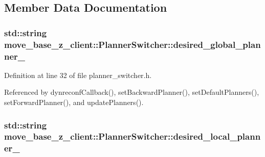 \subsection{Member Data Documentation}
\subsubsection[{\texorpdfstring{desired\+\_\+global\+\_\+planner\+\_\+}{desired_global_planner_}}]{\setlength{\rightskip}{0pt plus 5cm}std\+::string move\+\_\+base\+\_\+z\+\_\+client\+::\+Planner\+Switcher\+::desired\+\_\+global\+\_\+planner\+\_\+\hspace{0.3cm}{\ttfamily [private]}}\hypertarget{classmove__base__z__client_1_1PlannerSwitcher_a004c15858f0a6b9abcd8211d58a7e34c}{}\label{classmove__base__z__client_1_1PlannerSwitcher_a004c15858f0a6b9abcd8211d58a7e34c}


Definition at line 32 of file planner\+\_\+switcher.\+h.



Referenced by dynreconf\+Callback(), set\+Backward\+Planner(), set\+Default\+Planners(), set\+Forward\+Planner(), and update\+Planners().

\subsubsection[{\texorpdfstring{desired\+\_\+local\+\_\+planner\+\_\+}{desired_local_planner_}}]{\setlength{\rightskip}{0pt plus 5cm}std\+::string move\+\_\+base\+\_\+z\+\_\+client\+::\+Planner\+Switcher\+::desired\+\_\+local\+\_\+planner\+\_\+\hspace{0.3cm}{\ttfamily [private]}}\hypertarget{classmove__base__z__client_1_1PlannerSwitcher_ae47bd6c9c70b27cddcb394f26bb9372d}{}\label{classmove__base__z__client_1_1PlannerSwitcher_ae47bd6c9c70b27cddcb394f26bb9372d}


